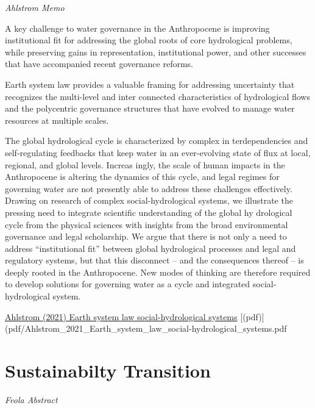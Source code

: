 \documentclass[
]{book}
\begin{document}
\emph{Ahlstrom Memo}

A key challenge to water governance
in the Anthropocene is improving institutional fit for addressing the
global roots of core hydrological problems, while preserving gains in
representation, institutional power, and other successes that have
accompanied recent governance reforms.

Earth system law provides a valuable framing for
addressing uncertainty that recognizes the multi-level and inter­
connected characteristics of hydrological flows and the polycentric
governance structures that have evolved to manage water resources at
multiple scales.

The global hydrological cycle is characterized by complex in­
terdependencies and self-regulating feedbacks that keep water in an
ever-evolving state of flux at local, regional, and global levels. Increas­
ingly, the scale of human impacts in the Anthropocene is altering the
dynamics of this cycle, and legal regimes for governing water are not
presently able to address these challenges effectively. Drawing on
research of complex social-hydrological systems, we illustrate the
pressing need to integrate scientific understanding of the global hy­
drological cycle from the physical sciences with insights from the broad
environmental governance and legal scholarship. We argue that there is
not only a need to address ``institutional fit'' between global hydrological
processes and legal and regulatory systems, but that this disconnect --
and the consequences thereof -- is deeply rooted in the Anthropocene.
New modes of thinking are therefore required to develop solutions for
governing water as a cycle and integrated social-hydrological system.

\href{https://www.sciencedirect.com/science/article/pii/S2589811621000240}{Ahlstrom (2021) Earth system law social-hydrological systems}
{[}(pdf){]}(pdf/Ahlstrom\_2021\_Earth\_system\_law\_social-hydrological\_systems.pdf

\hypertarget{sustainabilty-transition}{%
\chapter{Sustainabilty Transition}\label{sustainabilty-transition}}

\emph{Feola Abstract}
\end{document}
